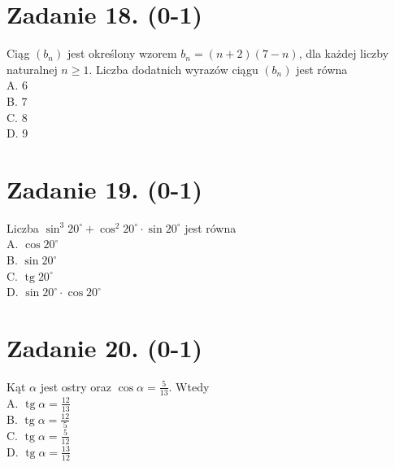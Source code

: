 \documentclass[10pt]{article}
\begin{document}
\section*{Zadanie 18. (0-1)}
Ciąg \(\left(b_{n}\right)\) jest określony wzorem \(b_{n}=(n+2)(7-n)\), dla każdej liczby naturalnej \(n \geq 1\). Liczba dodatnich wyrazów ciągu \(\left(b_{n}\right)\) jest równa\\
A. 6\\
B. 7\\
C. 8\\
D. 9

\section*{Zadanie 19. (0-1)}
Liczba \(\sin ^{3} 20^{\circ}+\cos ^{2} 20^{\circ} \cdot \sin 20^{\circ}\) jest równa\\
A. \(\cos 20^{\circ}\)\\
B. \(\sin 20^{\circ}\)\\
C. \(\operatorname{tg} 20^{\circ}\)\\
D. \(\sin 20^{\circ} \cdot \cos 20^{\circ}\)

\section*{Zadanie 20. (0-1)}
Kąt \(\alpha\) jest ostry oraz \(\cos \alpha=\frac{5}{13}\). Wtedy\\
A. \(\operatorname{tg} \alpha=\frac{12}{13}\)\\
B. \(\operatorname{tg} \alpha=\frac{12}{5}\)\\
C. \(\operatorname{tg} \alpha=\frac{5}{12}\)\\
D. \(\operatorname{tg} \alpha=\frac{13}{12}\)
\end{document}
